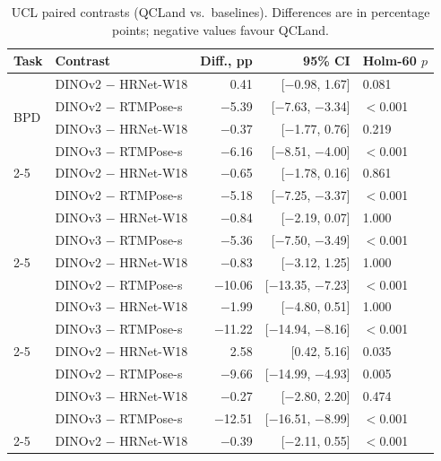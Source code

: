 \begin{table}[htbp]
  \centering
  \caption{UCL paired contrasts (QCLand vs.\ baselines). Differences
    are in percentage points; negative values favour QCLand.}
  \label{tab:ucl-paired}
  \footnotesize
  \setlength{\tabcolsep}{4pt}
  \renewcommand{\arraystretch}{0.92}
  \begin{tabular}{llrrl}
    \toprule
    Task & Contrast & Diff., pp & 95\% CI & Holm-60 $p$ \\
    \midrule
    \multirow{4}{*}{BPD}
      & DINOv2 $-$ HRNet-W18   & 0.41  & [$-$0.98, 1.67]       & 0.081 \\
      & DINOv2 $-$ RTMPose-s   & $-$5.39 & [$-$7.63, $-$3.34] & $<$0.001 \\
      & DINOv3 $-$ HRNet-W18   & $-$0.37 & [$-$1.77, 0.76]    & 0.219 \\
      & DINOv3 $-$ RTMPose-s   & $-$6.16 & [$-$8.51, $-$4.00] & $<$0.001 \\
    \cmidrule(lr){2-5}
    \multirow{4}{*}{OFD}
      & DINOv2 $-$ HRNet-W18   & $-$0.65 & [$-$1.78, 0.16]    & 0.861 \\
      & DINOv2 $-$ RTMPose-s   & $-$5.18 & [$-$7.25, $-$3.37] & $<$0.001 \\
      & DINOv3 $-$ HRNet-W18   & $-$0.84 & [$-$2.19, 0.07]    & 1.000 \\
      & DINOv3 $-$ RTMPose-s   & $-$5.36 & [$-$7.50, $-$3.49] & $<$0.001 \\
    \cmidrule(lr){2-5}
    \multirow{4}{*}{APAD}
      & DINOv2 $-$ HRNet-W18   & $-$0.83 & [$-$3.12, 1.25]    & 1.000 \\
      & DINOv2 $-$ RTMPose-s   & $-$10.06 & [$-$13.35, $-$7.23] & $<$0.001 \\
      & DINOv3 $-$ HRNet-W18   & $-$1.99 & [$-$4.80, 0.51]    & 1.000 \\
      & DINOv3 $-$ RTMPose-s   & $-$11.22 & [$-$14.94, $-$8.16] & $<$0.001 \\
    \cmidrule(lr){2-5}
    \multirow{4}{*}{TAD}
      & DINOv2 $-$ HRNet-W18   & 2.58  & [0.42, 5.16]          & 0.035 \\
      & DINOv2 $-$ RTMPose-s   & $-$9.66 & [$-$14.99, $-$4.93] & 0.005 \\
      & DINOv3 $-$ HRNet-W18   & $-$0.27 & [$-$2.80, 2.20]    & 0.474 \\
      & DINOv3 $-$ RTMPose-s   & $-$12.51 & [$-$16.51, $-$8.99] & $<$0.001 \\
    \cmidrule(lr){2-5}
    \multirow{4}{*}{FL}
      & DINOv2 $-$ HRNet-W18   & $-$0.39 & [$-$2.11, 0.55]    & $<$0.001 \\

\end{tabular}
\end{table}
